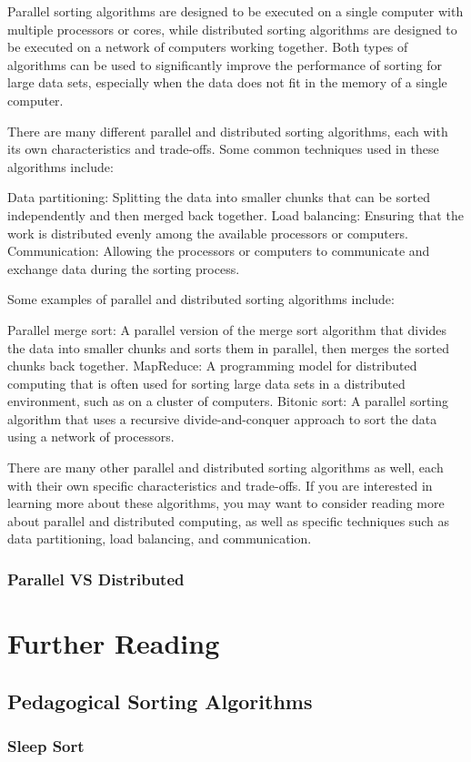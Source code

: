 Parallel sorting algorithms are designed to be executed on a single computer with multiple processors or cores, while distributed sorting algorithms are designed to be executed on a network of computers working together. Both types of algorithms can be used to significantly improve the performance of sorting for large data sets, especially when the data does not fit in the memory of a single computer.

There are many different parallel and distributed sorting algorithms, each with its own characteristics and trade-offs. Some common techniques used in these algorithms include:

Data partitioning: Splitting the data into smaller chunks that can be sorted independently and then merged back together.
Load balancing: Ensuring that the work is distributed evenly among the available processors or computers.
Communication: Allowing the processors or computers to communicate and exchange data during the sorting process.

Some examples of parallel and distributed sorting algorithms include:

Parallel merge sort: A parallel version of the merge sort algorithm that divides the data into smaller chunks and sorts them in parallel, then merges the sorted chunks back together.
MapReduce: A programming model for distributed computing that is often used for sorting large data sets in a distributed environment, such as on a cluster of computers.
Bitonic sort: A parallel sorting algorithm that uses a recursive divide-and-conquer approach to sort the data using a network of processors.

There are many other parallel and distributed sorting algorithms as well, each with their own specific characteristics and trade-offs. If you are interested in learning more about these algorithms, you may want to consider reading more about parallel and distributed computing, as well as specific techniques such as data partitioning, load balancing, and communication.

\subsubsection{Parallel VS Distributed}




\section{Further Reading}

\subsection{Pedagogical Sorting Algorithms}

\subsubsection{Sleep Sort}